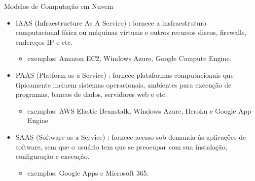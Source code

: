 \begin{frame}{Modelos de Computação em Nuvem}
  
  \begin{itemize}

    \item \alert{IAAS (Infraestructure As A Service)} : fornece a insfraestrutura computacional
      física ou máquinas virtuais e outros recursos discos, firewalls, endereços IP e etc.
    \begin{itemize}
     \item exemplos: Amazon EC2, Windows Azure, Google Compute Engine.
    \end{itemize}
    
    \item \alert{PAAS (Platform as a Service)} : fornece plataformas computacionais que tipicamente incluem sistemas operacionais,
      ambientes para execução de programas, bancos de dados, servidores web e etc.
    \begin{itemize}
     \item exemplos: AWS Elastic Beanstalk, Windows Azure, Heroku e Google App Engine
    \end{itemize}

    \item \alert{SAAS (Software as a Service)} : fornece acesso sob demanda às aplicações de software, sem que o usuário
      tem que se preocupar com sua instalação, configuração e execução.
    \begin{itemize}
     \item exemplos: Google Apps e Microsoft 365.
    \end{itemize}
 
  \end{itemize}
 
\end{frame}